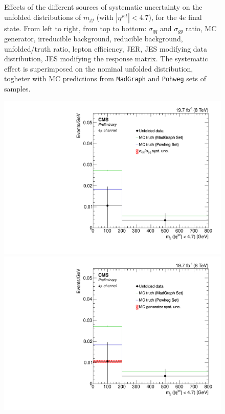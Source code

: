 \begin{figure}[hbtp]
\begin{center}
    \caption{Effects of the different sources of systematic uncertainty on the unfolded distributions of $m_{jj}$ (with $|\eta^{jet}|<4.7$), for the $4e$ final state. From left to right, from top to bottom: $\sigma_{qq}$ and $\sigma_{gg}$ ratio, MC generator, irreducible background,
reducible background, unfolded/truth ratio, lepton efficiency, JER, JES modifying data distribution, JES modifying the response matrix. The systematic effect is superimposed on the nominal unfolded distribution, togheter with MC predictions from \texttt{MadGraph} and \texttt{Pohweg} sets of samples.}
    \label{fig:Mjj_syst_4e}
  \end{center}
\end{figure}

\begin{figure}[hbtp]
  \begin{center}
    \includegraphics[width=0.8\cmsFigWidth]{Figures/Unfolding/Systematics/ZZTo4m_Mjj_qqgg_Mad_fr}     
    \includegraphics[width=0.8\cmsFigWidth]{Figures/Unfolding/Systematics/ZZTo4m_Mjj_MCgen_Mad_fr}     

\end{center}
\end{figure}

